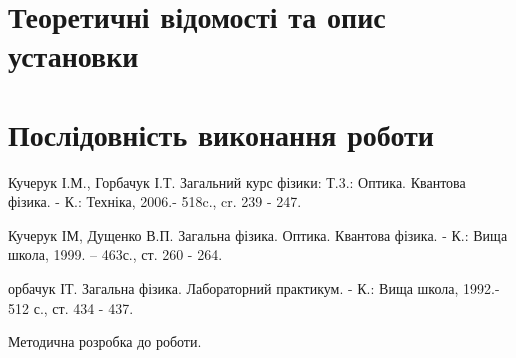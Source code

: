 \documentclass[twocolumn]{el-author}
\begin{document}
\section{Теоретичні відомості та опис установки}







\section{Послідовність виконання роботи}

\begin{thebibliography}{}

Кучерук І.М., Горбачук І.Т. Загальний курс фізики: Т.3.: Оптика.
Квантова фізика. - К.: Техніка, 2006.- 518c., cr. 239 - 247.

Кучерук ІМ, Дущенко В.П. Загальна фізика. Оптика. Квантова
фізика. - К.: Вища школа, 1999. -- 463с., ст. 260 - 264.

орбачук ІТ. Загальна фізика. Лабораторний практикум. - К.:
Вища школа, 1992.- 512 с., ст. 434 - 437.

Методична розробка до роботи.

\end{thebibliography}
\end{document}
